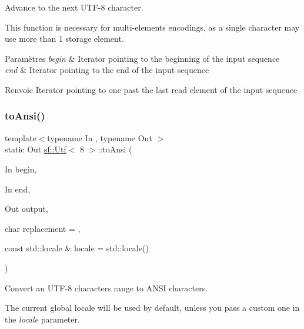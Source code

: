 Advance to the next U\+T\+F-\/8 character. 

This function is necessary for multi-\/elements encodings, as a single character may use more than 1 storage element.


\begin{DoxyParams}{Paramètres}
{\em begin} & Iterator pointing to the beginning of the input sequence \\
\hline
{\em end} & Iterator pointing to the end of the input sequence\\
\hline
\end{DoxyParams}
\begin{DoxyReturn}{Renvoie}
Iterator pointing to one past the last read element of the input sequence 
\end{DoxyReturn}
\mbox{\label{classsf_1_1Utf_3_018_01_4_a3d8b02f29021bd48831e7706d826f0c5}} 
\subsubsection{\texorpdfstring{to\+Ansi()}{toAnsi()}}
{\footnotesize\ttfamily template$<$typename In , typename Out $>$ \\
static Out \hyperlink{classsf_1_1Utf}{sf\+::\+Utf}$<$ 8 $>$\+::to\+Ansi (\begin{DoxyParamCaption}\item[{In}]{begin,  }\item[{In}]{end,  }\item[{Out}]{output,  }\item[{char}]{replacement = {},  }\item[{const std\+::locale \&}]{locale = {\ttfamily std\+:\+:locale()} }\end{DoxyParamCaption})\hspace{0.3cm}{\ttfamily [static]}}



Convert an U\+T\+F-\/8 characters range to A\+N\+SI characters. 

The current global locale will be used by default, unless you pass a custom one in the {\itshape locale} parameter.


